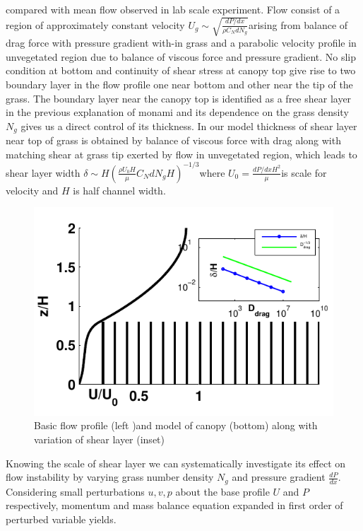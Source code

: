 \documentclass[aps,prl,twocolumn,showpacs,superscriptaddress,groupedaddress,10pt]{revtex4-1}  %
\begin{document}
compared with mean flow observed in lab scale experiment. Flow consist of a region of approximately constant velocity
\small$U_g \sim \sqrt{\frac{dP/dx}{\rho C_N dN_g}}$\normalsize arising from balance of drag force with pressure gradient with-in grass and a parabolic velocity 
profile in unvegetated region due to balance of viscous force and pressure gradient. No slip condition at bottom and continuity of shear stress at canopy top 
give rise to two boundary layer in the flow profile one near bottom and other near the tip of the grass. The boundary layer near the canopy top is identified 
as a free shear layer in the previous explanation of monami and its dependence on the grass density $N_g$ gives us a direct control of its thickness. 
In our model thickness of shear layer near top of grass is obtained by balance of viscous force 
with drag along with matching shear at grass tip exerted by flow in unvegetated region, which leads to shear layer 
width \small $\delta \sim  H\left(\frac{\rho U_0 H}{\mu} C_N d N_g H\right)^{-1/3}$\normalsize where \small$U_0 = \frac{dP/dxH^2}{\mu}$\normalsize is scale for velocity and
$H$ is half channel width.
\begin{figure}[htb]
  \includegraphics[scale=0.8]{fig1}
\caption{Basic flow profile (left )and model of canopy (bottom) along with variation of shear layer (inset) }
\end{figure}
\newline
Knowing the scale of shear layer we can systematically investigate its effect on flow instability
by varying grass number density $N_g$ and pressure gradient $\frac{dP}{dx}$. Considering small perturbations $u, v, p$ about the base profile $U$ and $P$
respectively, momentum and mass balance equation expanded in first order of perturbed variable yields.
\end{document}
